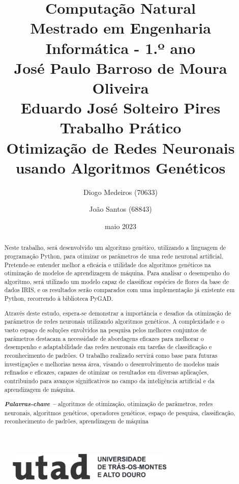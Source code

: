\documentclass[a4paper, portuguese]{report}
\title{{\textbf{Computação Natural}}\\ Mestrado em Engenharia Informática - 1.º ano\\\vspace*{1cm} José Paulo Barroso de Moura Oliveira\\ Eduardo José Solteiro Pires\\\vspace*{3cm}\textbf{Trabalho Prático}\\\vspace*{0.5cm} Otimização de Redes Neuronais usando Algoritmos Genéticos \vspace*{1cm}}
\author{Diogo Medeiros (70633) \and João Santos (68843)}
\date{maio 2023}
\providecommand{\keywords}[1]
{
    \small
    \textbf{\textit{Palavras-chave --}} #1
}
\begin{document}
    \begin{figure}
        \includegraphics[width=8cm]{images/utad}
        \label{fig:utad_logo}
    \end{figure}

    \maketitle

    \begin{abstract}

        Neste trabalho, será desenvolvido um algoritmo genético, utilizando a linguagem de programação Python, para otimizar os parâmetros de uma rede neuronal artificial.
        Pretende-se entender melhor a eficácia e utilidade dos algoritmos genéticos na otimização de modelos de aprendizagem de máquina.
        Para analisar o desempenho do algoritmo, será utilizado um modelo capaz de classificar espécies de flores da base de dados IRIS, e os resultados serão comparados com uma implementação já existente em Python, recorrendo à biblioteca PyGAD\@.

        Através deste estudo, espera-se demonstrar a importância e desafios da otimização de parâmetros de redes neuronais utilizando algoritmos genéticos.
        A complexidade e o vasto espaço de soluções envolvidos na pesquisa pelos melhores conjuntos de parâmetros destacam a necessidade de abordagens eficazes para melhorar o desempenho e adaptabilidade das redes neuronais em tarefas de classificação e reconhecimento de padrões.
        O trabalho realizado servirá como base para futuras investigações e melhorias nessa área, visando o desenvolvimento de modelos mais refinados e eficazes, capazes de otimizar os resultados em diversas aplicações, contribuindo para avanços significativos no campo da inteligência artificial e da aprendizagem de máquina.

        \keywords{algoritmos de otimização, otimização de parâmetros, redes neuronais, algoritmos genéticos, operadores genéticos, espaço de pesquisa, classificação, reconhecimento de padrões, aprendizagem de máquina}

    \end{abstract}

    \tableofcontents
    \listoffigures
    \listoftables
    \listoflistings
\end{document}
